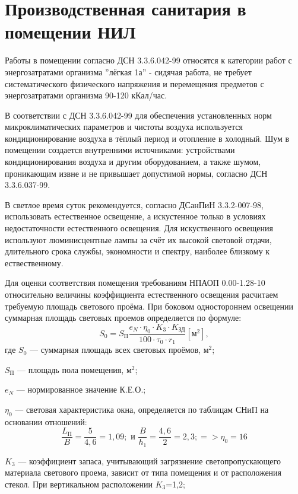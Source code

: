 \section{Производственная санитария в помещении НИЛ}

Работы в помещении согласно ДСН 3.3.6.042-99 относятся к категории работ с
энергозатратами организма ''лёгкая 1а'' - сидячая работа, не требует
систематического физического напряжения и перемещения предметов с
энергозатратами организма 90-120 кКал/час.

В соответствии с ДСН 3.3.6.042-99 для обеспечения установленных норм
микроклиматических параметров и чистоты воздуха используется кондиционирование
воздуха в тёплый период и отопление в холодный. Шум в помещении создается
внутренними источниками:  устройствами  кондиционирования воздуха и другим
оборудованием, а также шумом, проникающим извне и не привышает допустимой нормы,
согласно ДСН 3.3.6.037-99.

В светлое время суток рекомендуется, согласно ДСанПиН 3.3.2-007-98, использовать
естественное освещение, а искустенное только в условиях недостаточности
естественного освещения. Для искуственного освещения используют люминисцентные
лампы за счёт их высокой световой отдачи, длительного срока службы, экономности
и спектру, наиболее близкому к ествественному.

Для оценки соответствия помещения требованиям НПАОП 0.00-1.28-10 относительно
величины коэффициента естественного освещения расчитаем требуемую площадь
светового проёма. При боковом одностороннем освещении суммарная площадь световых
проемов определяется по формуле:
\begin{equation}S_0 = S_{\text{П}}\frac{e_N \cdot \eta_0 \cdot K_3 \cdot K_{\text{ЗД}}}{100 \cdot \tau_0 \cdot r_1} [\text{м}^2],\end{equation}
где \hspace{4mm}$S_0$ --- суммарная площадь всех световых проёмов, $\text{м}^2$;

$S_\text{П}$ --- площадь пола помещения, $\text{м}^2$;

$e_N$ --- нормированное значение К.Е.О.;

$\eta_0$ --- световая характеристика окна, определяется по таблицам СНиП на основании отношений:
\begin{equation}\frac{L_\text{П}}{B} = \frac{5}{4,6} = 1,09; \text{ и } \frac{B}{h_1} = \frac{4,6}{2} = 2,3; => \eta_0 = 16\end{equation}

$K_3$ --- коэффициент запаса, учитывающий загрязнение светопропускающего
материала светового проема, зависит от типа помещения и от расположения стекол.
При вертикальном расположении $K_3$=1,2;

